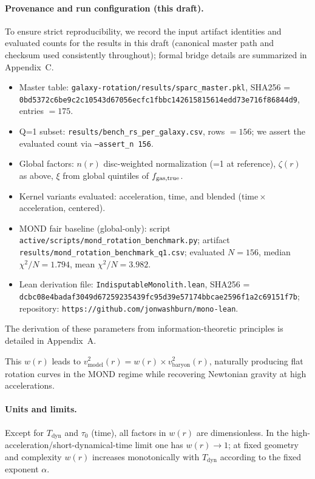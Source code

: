 \documentclass[12pt,a4paper]{article}
\begin{document}
\paragraph{Provenance and run configuration (this draft).} To ensure strict reproducibility, we record the input artifact identities and evaluated counts for the results in this draft (canonical master path and checksum used consistently throughout); formal bridge details are summarized in Appendix~C.
\begin{itemize}
  \item Master table: \texttt{galaxy-rotation/results/sparc\_master.pkl}, SHA256 = \texttt{0bd5372c6be9c2c10543d67056ecfc1fbbc142615815614edd73e716f86844d9}, entries $=175$.
  \item Q=1 subset: \texttt{results/bench\_rs\_per\_galaxy.csv}, rows $=156$; we assert the evaluated count via \texttt{--assert\_n 156}.
  \item Global factors: $n(r)$ disc-weighted normalization (=1 at reference), $\zeta(r)$ as above, $\xi$ from global quintiles of $f_{\rm gas,true}$.
  \item Kernel variants evaluated: acceleration, time, and blended (time\,$\times$\,acceleration, centered).
  \item MOND fair baseline (global-only): script \texttt{active/scripts/mond\_rotation\_benchmark.py}; artifact \texttt{results/mond\_rotation\_benchmark\_q1.csv}; evaluated $N=156$, median $\chi^2/N=1.794$, mean $\chi^2/N=3.982$.
  \item Lean derivation file: \texttt{IndisputableMonolith.lean}, SHA256 = \texttt{dcbc08e4badaf3049d67259235439fc95d39e57174bbcae2596f1a2c69151f7b}; repository: \texttt{https://github.com/jonwashburn/mono-lean}.
\end{itemize}

The derivation of these parameters from information-theoretic principles is detailed in Appendix~A.

This $w(r)$ leads to $v^2_\mathrm{model}(r) = w(r) \times v^2_\mathrm{baryon}(r)$, naturally producing flat rotation curves in the MOND regime while recovering Newtonian gravity at high accelerations.

\paragraph{Units and limits.} Except for $T_\mathrm{dyn}$ and $\tau_0$ (time), all factors in $w(r)$ are dimensionless. In the high-acceleration/short-dynamical-time limit one has $w(r)\to 1$; at fixed geometry and complexity $w(r)$ increases monotonically with $T_\mathrm{dyn}$ according to the fixed exponent $\alpha$.
\end{document}
